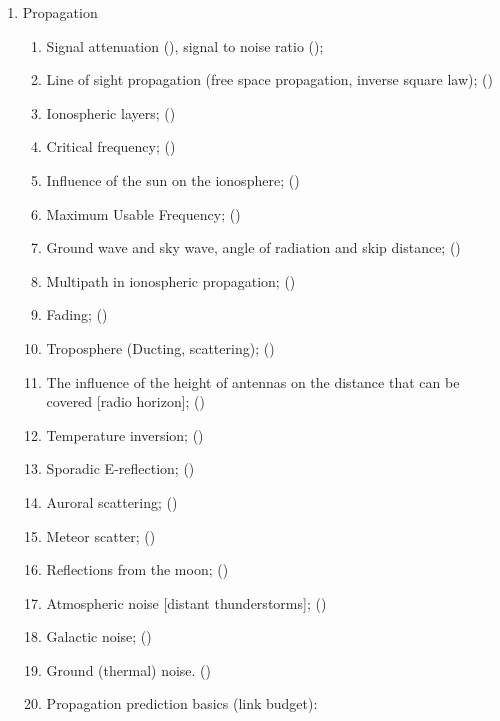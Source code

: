 \begin{flushleft}
\begin{enumerate}
\item Propagation
\begin{enumerate}
\item Signal attenuation ()\label{HAREC.a.7.1.1},
  signal to noise ratio ()\label{HAREC.a.7.1.2};
\item Line of sight propagation (free space propagation, inverse square law);
  ()\label{HAREC.a.7.2}
\item Ionospheric layers; ()\label{HAREC.a.7.3}
\item Critical frequency; ()\label{HAREC.a.7.4}
\item Influence of the sun on the ionosphere;
  ()\label{HAREC.a.7.5}
\item Maximum Usable Frequency; ()\label{HAREC.a.7.6}
\item Ground wave and sky wave, angle of radiation and skip distance;
  ()\label{HAREC.a.7.7}
\item Multipath in ionospheric propagation;
  ()\label{HAREC.a.7.8}
\item Fading; ()\label{HAREC.a.7.9}
\item Troposphere (Ducting, scattering);
  ()\label{HAREC.a.7.10}
\item The influence of the height of antennas on the distance that can be
  covered [radio horizon]; ()\label{HAREC.a.7.11}
\item Temperature inversion; ()\label{HAREC.a.7.12}
\item Sporadic E-reflection; ()\label{HAREC.a.7.13}
\item Auroral scattering; ()\label{HAREC.a.7.14}
\item Meteor scatter; ()\label{HAREC.a.7.15}
\item Reflections from the moon; ()\label{HAREC.a.7.16}
\item Atmospheric noise [distant thunderstorms];
  ()\label{HAREC.a.7.17}
\item Galactic noise; ()\label{HAREC.a.7.18}
\item Ground (thermal) noise. ()\label{HAREC.a.7.19}
\item Propagation prediction basics (link budget):

\end{enumerate}
\end{enumerate}
\end{flushleft}
